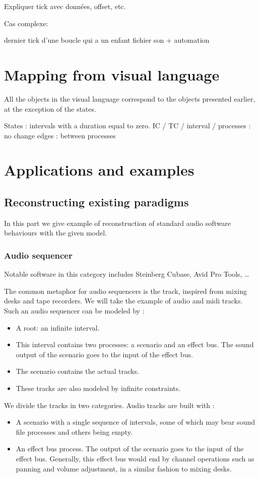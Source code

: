 \documentclass[applsci,article,submit,moreauthors,pdftex,10pt,a4paper]{mdpi}
\begin{document}
Expliquer tick avec données, offset, etc.

Cas complexe: 

dernier tick d'une boucle qui a un enfant fichier son + automation



\section{Mapping from visual language}
All the objects in the visual language correspond to the objects presented earlier, at the exception of the states.

States : intervals with a duration equal to zero.
IC / TC / interval / processes : no change
edges : between processes
\section{Applications and examples}

\subsection{Reconstructing existing paradigms}\label{sec.existingparadigms}
In this part we give example of reconstruction of standard audio software behaviours with the given model.
\subsubsection{Audio sequencer}
Notable software in this category includes Steinberg Cubase, Avid Pro Tools, \dots

The common metaphor for audio sequencers is the track, inspired from mixing desks and tape recorders. 
We will take the example of audio and midi tracks. 
Such an audio sequencer can be modeled by : 

\begin{itemize}
    \item A root: an infinite interval.
    \item This interval contains two processes: a scenario and an effect bus. 
    The sound output of the scenario goes to the input of the effect bus.
    \item The scenario contains the actual tracks.
    \item These tracks are also modeled by infinite constraints.
\end{itemize}

We divide the tracks in two categories.
Audio tracks are built with : 
\begin{itemize}
  \item A scenario with a single sequence of intervals, some of which may bear sound file processes and others being empty.
  \item An effect bus process. The output of the scenario goes to the input of the effect bus. Generally, this effect bus would end by channel operations such as panning and volume adjustment, in a similar fashion to mixing desks.
\end{itemize} 
\end{document}
